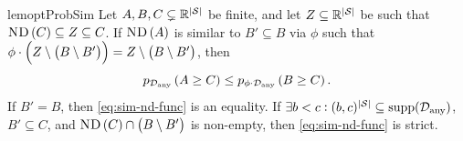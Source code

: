 \begin{restatable}{lem}{optProbSim}\label{lem:sim-lin-func-opt}
Let $A,B,C\subsetneq \mathbb{R}^{\left|\mathcal{S}\right|}$ be finite, and let $Z\subseteq \mathbb{R}^{\left|\mathcal{S}\right|}$ be such that $\text{\upshape\textsc{ND}}\left(C\right)\subseteq Z\subseteq C$. If $\text{\upshape\textsc{ND}}\left(A\right)$ is similar to $B'\subseteq B$ via $\phi$ such that $\phi\cdot \left(Z\setminus \left(B\setminus B'\right)\right)=Z\setminus \left(B\setminus B'\right)$, then 
\begin{equation}
    \phelper{A\geq C}[\Dany]\leq \phelper{B\geq C}[\phi\cdot \Dany].\label{eq:sim-nd-func}
\end{equation} 
If $B'=B$, then \cref{eq:sim-nd-func} is an equality. If $\exists b<c: (b,c)^{\abs{\St}}\subseteq \supp[\Dany]$, $B'\subseteq C$, and $\text{\upshape\textsc{ND}}\left(C\right)\cap \left(B\setminus B'\right)$ is non-empty, then \cref{eq:sim-nd-func} is strict.
\end{restatable}
